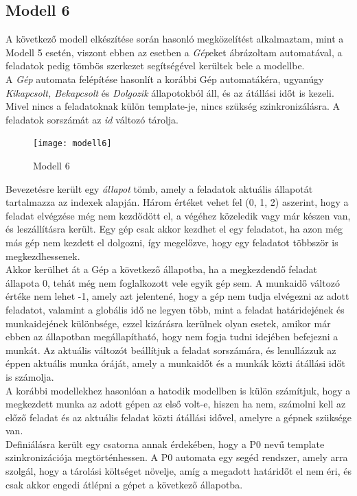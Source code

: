\documentclass {report}
\begin{document}
\subsection{Modell 6}
A következő modell elkészítése során hasonló megközelítést alkalmaztam, mint a Modell 5 esetén, viszont ebben az esetben a \emph{Gép}eket ábrázoltam automatával, a feladatok pedig tömbös szerkezet segítségével kerültek bele a modellbe.\\
A \emph{Gép} automata felépítése hasonlít a korábbi Gép automatákéra, ugyanúgy \emph{Kikapcsolt, Bekapcsolt} és \emph{Dolgozik} állapotokból áll, és az átállási időt is kezeli. Mivel nincs a feladatoknak külön template-je, nincs szükség szinkronizálásra. A feladatok sorszámát az \emph{id} változó tárolja.\\
\begin{figure}[htpb]
\begin{center}
\texttt{[image: modell6]}
\caption{Modell 6}
\end{center}
\end{figure}
Bevezetésre került egy \emph{állapot} tömb, amely a feladatok aktuális állapotát tartalmazza az indexek alapján. Három értéket vehet fel (0, 1, 2) aszerint, hogy a feladat elvégzése még nem kezdődött el, a végéhez közeledik vagy már készen van, és leszállításra került. Egy gép csak akkor kezdhet el egy feladatot, ha azon még más gép nem kezdett el dolgozni, így megelőzve, hogy egy feladatot többször is megkezdhessenek. \\
Akkor kerülhet át a Gép a következő állapotba, ha a megkezdendő feladat állapota 0, tehát még nem foglalkozott vele egyik gép sem. A munkaidő változó értéke nem lehet -1, amely azt jelentené, hogy a gép nem tudja elvégezni az adott feladatot, valamint a globális idő ne legyen több, mint a feladat határidejének és munkaidejének különbsége, ezzel kizárásra kerülnek olyan esetek, amikor már ebben az állapotban megállapítható, hogy nem fogja tudni idejében befejezni a munkát. Az aktuális változót beállítjuk a feladat sorszámára, és lenullázzuk az éppen aktuális munka óráját, amely a munkaidőt és a munkák közti átállási időt is számolja. \\
A korábbi modellekhez hasonlóan a hatodik modellben is külön számítjuk, hogy a megkezdett munka az adott gépen az első volt-e, hiszen ha nem, számolni kell az előző feladat és az aktuális feladat közti átállási idővel, amelyre a gépnek szüksége van.\\
Definiálásra került egy csatorna annak érdekében, hogy a P0 nevű template szinkronizációja megtörténhessen. A P0 automata egy segéd rendszer, amely arra szolgál, hogy a tárolási költséget növelje, amíg a megadott határidőt el nem éri, és csak akkor engedi átlépni a gépet a következő állapotba.
\end{document}
